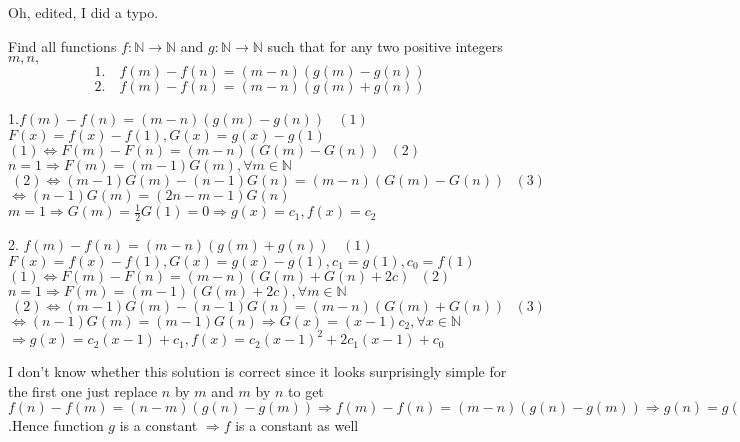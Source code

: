 \begin{solution}
	Oh, edited, I did a typo.
\end{solution}



\begin{solution}
	\begin{tcolorbox}Find all functions $f:\mathbb N\to \mathbb N$ and $g:\mathbb N\to \mathbb N$ such that for any two positive integers $m,n,$ \[1.\quad f(m)-f(n)=(m-n)(g(m)-g(n))\]
\[2.\quad f(m)-f(n)=(m-n)(g(m)+g(n))\]\end{tcolorbox}
1.$f(m)-f(n)=(m-n)(g(m)-g(n))\ \ \ \ (1)$
$F\left( x \right)=f\left( x \right)-f\left( 1 \right),G\left( x \right)=g\left( x \right)-g\left( 1 \right)$
$(1)\Leftrightarrow F(m)-F(n)=(m-n)(G(m)-G(n))\ \ \ (2)$
$n=1\Rightarrow F(m)=(m-1)G(m),\forall m\in \mathbb{N}\ $
$\ (2)\Leftrightarrow (m-1)G(m)-(n-1)G(n)=(m-n)(G(m)-G(n))\ \ \ (3)$
$\Leftrightarrow (n-1)G(m)=(2n-m-1)G(n)$
$m=1\Rightarrow G(m)=\frac{1}{2}G\left( 1 \right)=0\Rightarrow g\left( x \right)={{c}_{1}},f\left( x \right)={{c}_{2}}$
\end{solution}



\begin{solution}
	2.
$f(m)-f(n)=(m-n)(g(m)+g(n))\ \ \ \ (1)$
$F\left( x \right)=f\left( x \right)-f\left( 1 \right),G\left( x \right)=g\left( x \right)-g\left( 1 \right),{{c}_{1}}=g\left( 1 \right),{{c}_{0}}=f\left( 1 \right)$
$(1)\Leftrightarrow F(m)-F(n)=(m-n)(G(m)+G(n)+2c)\ \ \ (2)$
$n=1\Rightarrow F(m)=(m-1)\left( G\left( m \right)+2c \right),\forall m\in \mathbb{N}$
$\ (2)\Leftrightarrow (m-1)G(m)-(n-1)G(n)=(m-n)(G(m)+G(n))\ \ \ (3)$
$\Leftrightarrow (n-1)G(m)=(m-1)G(n)\Rightarrow G\left( x \right)=\left( x-1 \right){{c}_{2}},\forall x\in \mathbb{N}$
$\Rightarrow g\left( x \right)={{c}_{2}}\left( x-1 \right)+{{c}_{1}},f\left( x \right)={{c}_{2}}{{\left( x-1 \right)}^{2}}+2{{c}_{1}}\left( x-1 \right)+{{c}_{0}}$
\end{solution}



\begin{solution}
	I don't know whether this solution is correct since it looks surprisingly  simple for the first one just replace $n$ by $m$ and $m$ by $n$ to get $f(n)-f(m)=(n-m)(g(n)-g(m)) \Rightarrow f(m)-f(n)=(m-n)(g(n)-g(m)) \Rightarrow g(n)=g(m)$ .Hence function $g$ is a constant $\Rightarrow f$ is a constant as well
\end{solution}



